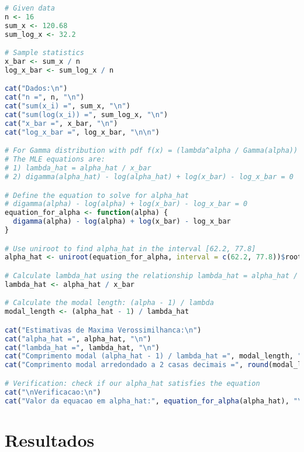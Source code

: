 \documentclass[11pt,a4paper]{article}
\begin{document}
\begin{lstlisting}[language=R]
# Given data
n <- 16
sum_x <- 120.68
sum_log_x <- 32.2

# Sample statistics
x_bar <- sum_x / n
log_x_bar <- sum_log_x / n

cat("Dados:\n")
cat("n =", n, "\n")
cat("sum(x_i) =", sum_x, "\n")
cat("sum(log(x_i)) =", sum_log_x, "\n")
cat("x_bar =", x_bar, "\n")
cat("log_x_bar =", log_x_bar, "\n\n")

# For Gamma distribution with pdf f(x) = (lambda^alpha / Gamma(alpha)) * x^(alpha-1) * exp(-lambda*x)
# The MLE equations are:
# 1) lambda_hat = alpha_hat / x_bar
# 2) digamma(alpha_hat) - log(alpha_hat) + log(x_bar) - log_x_bar = 0

# Define the equation to solve for alpha_hat
# digamma(alpha) - log(alpha) + log(x_bar) - log_x_bar = 0
equation_for_alpha <- function(alpha) {
  digamma(alpha) - log(alpha) + log(x_bar) - log_x_bar
}

# Use uniroot to find alpha_hat in the interval [62.2, 77.8]
alpha_hat <- uniroot(equation_for_alpha, interval = c(62.2, 77.8))$root

# Calculate lambda_hat using the relationship lambda_hat = alpha_hat / x_bar
lambda_hat <- alpha_hat / x_bar

# Calculate the modal length: (alpha - 1) / lambda
modal_length <- (alpha_hat - 1) / lambda_hat

cat("Estimativas de Maxima Verossimilhanca:\n")
cat("alpha_hat =", alpha_hat, "\n")
cat("lambda_hat =", lambda_hat, "\n")
cat("Comprimento modal (alpha_hat - 1) / lambda_hat =", modal_length, "\n")
cat("Comprimento modal arredondado a 2 casas decimais =", round(modal_length, 2), "\n")

# Verification: check if our alpha_hat satisfies the equation
cat("\nVerificacao:\n")
cat("Valor da equacao em alpha_hat:", equation_for_alpha(alpha_hat), "\n")
\end{lstlisting}

\section*{Resultados}
\end{document}
